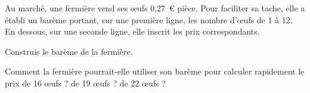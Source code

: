 Au marché, une fermière vend ses \oe ufs 0,27~\textgreek{\euro} pièce. Pour faciliter sa tache, elle a établi un barème portant, sur une première ligne, les nombre d'\oe ufs de 1 à 12. En dessous, sur une seconde ligne, elle inscrit les prix correspondants.
\begin{myenumerate}
\item Construis le barème de la fermière.
\item Comment la fermière pourrait-elle utiliser son barème pour calculer rapidement le prix de 16 \oe ufs ? de 19 \oe ufs ? de 22 \oe ufs ?
\end{myenumerate}
